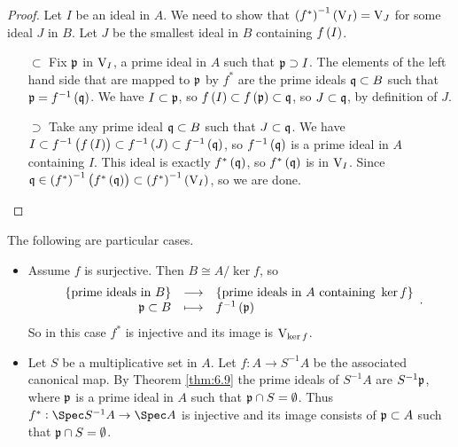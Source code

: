 \begin{proof}
Let $ I $ be an ideal in $ A $. We need to show that $ \br{f^*}^{-1}\br{\V_I} = \V_J $ for some ideal $ J $ in $ B $. Let $ J $ be the smallest ideal in $ B $ containing $ f\br{I} $.
\begin{itemize}
\item[$ \subset $] Fix $ \mathfrak{p} $ in $ \mathrm{V}_I $, a prime ideal in $ A $ such that $ \mathfrak{p} \supset I $. The elements of the left hand side that are mapped to $ \mathfrak{p} $ by $ f^* $ are the prime ideals $ \mathfrak{q} \subset B $ such that $ \ppp = f^{-1}\br{\qqq} $. We have $ I \subset \mathfrak{p} $, so $ f\br{I} \subset f\br{\ppp} \subset \qqq $, so $ J \subset \mathfrak{q} $, by definition of $ J $.
\item[$ \supset $] Take any prime ideal $ \mathfrak{q} \subset B $ such that $ J \subset \mathfrak{q} $. We have $ I \subset f^{-1}\br{f\br{I}} \subset f^{-1}\br{J} \subset f^{-1}\br{\qqq} $, so $ f^{-1}\br{\qqq} $ is a prime ideal in $ A $ containing $ I $. This ideal is exactly $ f^*\br{\qqq} $, so $ f^*\br{\qqq} $ is in $ \mathrm{V}_I $. Since $ \qqq \in \br{f^*}^{-1}\br{f^*\br{\qqq}} \subset \br{f^*}^{-1}\br{\V_I} $, so we are done.
\end{itemize}
\end{proof}

\pagebreak


The following are particular cases.
\begin{itemize}
\item Assume $ f $ is surjective. Then $ B \cong A / \ker f $, so
$$ \function{\cbr{\text{prime ideals in} \ B}}{\cbr{\text{prime ideals in} \ A \ \text{containing} \ \ker f}}{\ppp \subset B}{f^{-1}\br{\ppp}}. $$
So in this case $ f^* $ is injective and its image is $ \mathrm{V}_{\ker f} $.
\item Let $ S $ be a multiplicative set in $ A $. Let $ f : A \to S^{-1}A $ be the associated canonical map. By Theorem \ref{thm:6.9} the prime ideals of $ S^{-1}A $ are $ S^{-1}\mathfrak{p} $, where $ \mathfrak{p} $ is a prime ideal in $ A $ such that $ \mathfrak{p} \cap S = \emptyset $. Thus $ f^* : \Spec S^{-1}A \to \Spec A $ is injective and its image consists of $ \mathfrak{p} \subset A $ such that $ \mathfrak{p} \cap S = \emptyset $.
\end{itemize}

